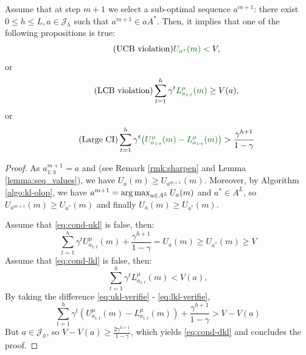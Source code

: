 \begin{lemma}
	\label{lemma:sub-optimal-pull}
	\begin{leftbar}[lemmabar]
	Assume that at step $m+1$ we select a sub-optimal sequence $a^{m+1}$: there exist $0 \leq h \leq L,  a\in \mathcal{J}_h$ such that $a^{m+1} \in aA^*$. Then, it implies that one of the following propositions is true:
	\begin{equation}
	\label{eq:cond-ukl}
	\tag{UCB violation}
	\diff{U_{a^*}(m)} < V,
	\end{equation}
	or
	\begin{equation}
	\tag{LCB violation}
	\label{eq:cond-lkl}
	\sum_{t=1}^h \gamma^t \diff{L^{\mu}_{a_{1:t}}(m)} \geq V(a),
	\end{equation}
	or
	\begin{equation}
	\tag{Large CI}
	\label{eq:cond-dkl}
	\sum_{t=1}^h \gamma^t\diff{\left(U^{\mu}_{a_{1:t}}(m) - L^{\mu}_{a_{1:t}}(m)\right)} > \frac{\gamma^{h+1}}{1-\gamma}
	\end{equation}
	\end{leftbar}
\end{lemma}
\begin{proof}
	As $a^{m+1}_{1:h} = a$ and  (see Remark \ref{rmk:sharpen} and Lemma \ref{lemma:seq_values}), we have $U_a(m) \geq U_{a^{m+1}}(m)$. Moreover, by Algorithm \ref{algo:kl-olop}, we have $a^{m+1} = \operatorname*{arg\,max}_{a \in A^L}  U_a(m)$ and $a^*\in A^L$, so $U_{a^{m+1}}(m) \geq U_{a^*}(m)$ and finally $U_a(m) \geq U_{a^*}(m)$.
	
	Assume that \eqref{eq:cond-ukl} is false, then:
	\begin{equation}
	\label{eq:ukl-verifie}
	\sum_{t=1}^h \gamma^t U^{\mu}_{a_{1:t}}(m) + \frac{\gamma^{h+1}}{1-\gamma} = U_a(m) \geq U_{a^*}(m) \geq V
	\end{equation}
	Assume that \eqref{eq:cond-lkl} is false, then:
	\begin{equation}
	\label{eq:lkl-verifie}
	\sum_{t=1}^h \gamma^t L^{\mu}_{a_{1:t}}(m) < V(a),
	\end{equation}
	By taking the difference \eqref{eq:ukl-verifie} - \eqref{eq:lkl-verifie}, 
	\begin{equation*}
	\sum_{t=1}^h \gamma^t \left(U^{\mu}_{a_{1:t}}(m) - L^{\mu}_{a_{1:t}}(m)\right) + \frac{\gamma^{h+1}}{1-\gamma} > V - V(a)
	\end{equation*}
	But $a \in \mathcal{J}_h$, so $V - V(a) \geq \frac{2\gamma^{h+1}}{1-\gamma}$, which yields \eqref{eq:cond-dkl} and concludes the proof.
\end{proof}

